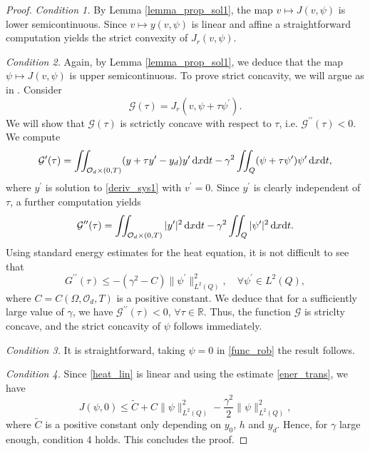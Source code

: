 \documentclass{aims}
\theoremstyle{definition}
\def\dx{\,\textnormal{d}x}
\def\dt{\textnormal{d}t}
\begin{document}
\begin{proof}
\textit{Condition 1.} By Lemma \ref{lemma_prop_sol1}, the map $v\mapsto J(v,\psi)$ is lower semicontinuous. Since $v\mapsto y(v,\psi)$ is linear and affine a straightforward computation yields the strict convexity of $J_r(v,\psi)$. 

\smallskip\noindent
\textit{Condition 2.} Again, by Lemma \ref{lemma_prop_sol1}, we deduce that the map $\psi\mapsto J(v,\psi)$ is upper semicontinuous. To prove strict concavity, we will argue as in \cite{temam_nonlinear}. Consider
%
\begin{equation*}
\mathcal{G}(\tau)=J_r(v,\psi+\tau \psi^\prime).
\end{equation*}
%
We will show that $\mathcal G(\tau)$ is sctrictly concave with respect to $\tau$, i.e. $\mathcal G^{\prime\prime}(\tau)<0$. We compute
%
\begin{equation*}
\mathcal G^\prime(\tau)=\iint_{\mathcal O_d\times(0,T)}(y+\tau y^\prime-y_d)y^\prime\dx\dt-\gamma^2\iint_{Q}(\psi+\tau\psi^\prime)\psi^\prime\dx\dt,
\end{equation*}
%
where $y^\prime$ is solution to \eqref{deriv_sys1} with $v^\prime=0$. Since $y^\prime$ is clearly independent of $\tau$, a further computation yields
%
\begin{equation*}
\mathcal G^{\prime\prime}(\tau)=\iint_{\mathcal O_d\times(0,T)}|y^\prime|^2\dx\dt-\gamma^2\iint_{Q}|\psi^\prime|^2\dx\dt.
\end{equation*}
%
Using standard energy estimates for the heat equation, it is not difficult to see that 
%
\begin{equation*}
G^{\prime\prime}(\tau)\leq -(\gamma^2-C)\|\psi^\prime\|^2_{L^2(Q)}, \quad \forall \psi^\prime\in L^2(Q),
\end{equation*}
%
where $C=C(\Omega,\mathcal O_d,T)$ is a positive constant. We deduce that for a sufficiently large value of $\gamma$, we have $\mathcal G^{\prime\prime}(\tau)<0$, $\forall \tau\in \mathbb{R}$. Thus, the function $\mathcal G$ is striclty concave, and the strict concavity of $\psi$ follows immediately. 

\smallskip\noindent
\textit{Condition 3.} It is straightforward, taking $\psi=0$ in \eqref{func_rob} the result follows. 

\smallskip\noindent
\textit{Condition 4.} Since \eqref{heat_lin} is linear and using the estimate \eqref{ener_trans}, we have
%
\begin{equation*}
J(\psi,0)\leq \tilde C+C\|\psi\|_{L^2(Q)}^2-\frac{\gamma^2}{2}\|\psi\|_{L^2(Q)}^2,
\end{equation*}
%
where $\tilde C$ is a positive constant only depending on $y_0$, $h$ and $y_d$. Hence, for $\gamma$ large enough, condition 4 holds. This concludes the proof.
%
\end{proof}
\end{document}
